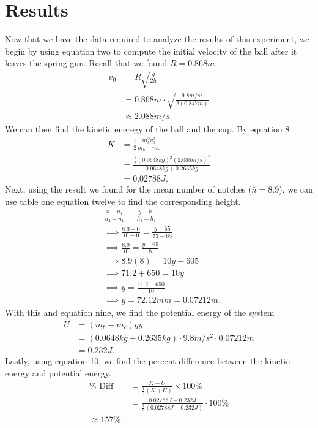 \documentclass{report}
\begin{document}
    \bigbreak \noindent 
    \section{Results}
    \bigbreak \noindent 
    Now that we have the data required to analyze the results of this experiment, we begin by using equation two to compute the initial velocity of the ball after it leaves the spring gun. Recall that we found $R=0.868m$
    \begin{align*}
        v_0&=R \sqrt{\frac{g}{2 h}} \\
           &=0.868m \cdot \sqrt{\frac{9.8 m/s^{2}}{2(0.847m)}} \\
           &\approx 2.088m/s
    .\end{align*}
    \bigbreak \noindent 
    We can then find the kinetic eneregy of the ball and the cup. By equation 8
    \begin{align*}
        K & =\frac{1}{2} \frac{m_b^2 v_0^2}{m_b+m_c} \\
          &= \frac{\frac{1}{2}(0.0648kg)^{2}(2.088 m/s)^{2}}{0.0648kg+ 0.2635kg} \\
          &=0.02788J
    .\end{align*}
    \bigbreak \noindent 
    Next, using the result we found for the mean number of notches ($\bar{n}=8.9$), we can use table one equation twelve to find the corresponding height.
    \begin{align*}
        &\frac{x-n_1}{n_2-n_1}=\frac{y-h_1}{h_2-h_1} \\
         &\implies\frac{8.9-0}{10-0} = \frac{y-65}{73-65} \\
         &\implies\frac{8.9}{10} = \frac{y-65}{8}  \\
         &\implies 8.9(8) = 10y - 605 \\
         &\implies 71.2 + 650 = 10y \\
         &\implies y = \frac{71.2+650}{10} \\
         &\implies y=72.12mm = 0.07212m
    .\end{align*}
    \bigbreak \noindent 
    With this and equation nine, we find the potential energy of the system
    \begin{align*}
        U&=\left(m_b+m_c\right) g y \\
         &=(0.0648kg + 0.2635kg) \cdot 9.8 m/s^{2} \cdot 0.07212m \\
         &=0.232J
    .\end{align*}
    \bigbreak \noindent 
    Lastly, using equation 10, we find the percent difference between the kinetic energy and potential energy.
    \begin{align*}
        \% \text { Diff }&=\frac{K-U}{\frac{1}{2}(K+U)} \times 100 \% \\
                         &= \frac{0.02788J - 0.232J}{\frac{1}{2}(0.02788J + 0.232J)} \cdot 100\% \\
                         \approx 157\%
    .\end{align*}
\end{document}

